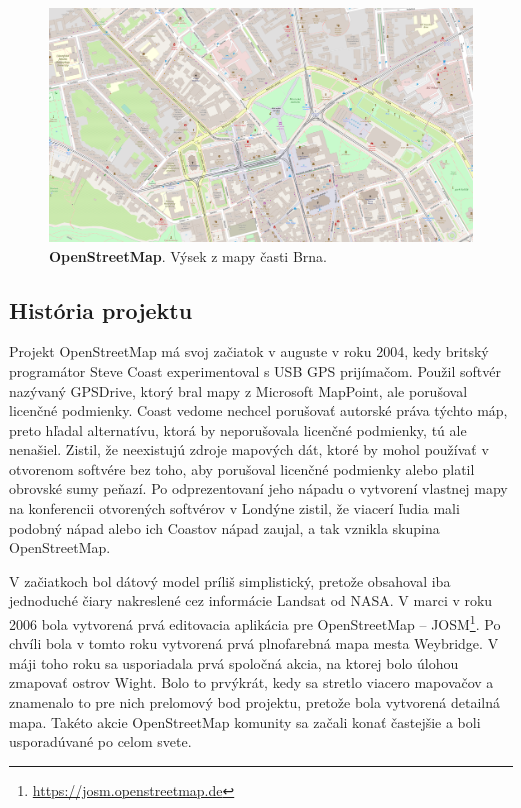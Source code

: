 \begin{figure}[ht]
    \centering
    \includegraphics[width=\linewidth]{obrazky-figures/openstreetmap.png}
    \caption{\textbf{OpenStreetMap}. Výsek z mapy časti Brna.}
    \label{fig:openstreetmap}
\end{figure}

\subsection*{História projektu}
Projekt OpenStreetMap má svoj začiatok v auguste v roku 2004, kedy britský programátor Steve Coast experimentoval s USB GPS prijímačom. Použil softvér nazývaný GPSDrive, ktorý bral mapy z Microsoft MapPoint, ale porušoval licenčné podmienky. Coast vedome nechcel porušovať autorské práva týchto máp, preto hľadal alternatívu, ktorá by neporušovala licenčné podmienky, tú ale nenašiel. Zistil, že neexistujú zdroje mapových dát, ktoré by mohol používať v otvorenom softvére bez toho, aby porušoval licenčné podmienky alebo platil obrovské sumy peňazí. Po odprezentovaní jeho nápadu o vytvorení vlastnej mapy na konferencii otvorených softvérov v Londýne zistil, že viacerí ľudia mali podobný nápad alebo ich Coastov nápad zaujal, a tak vznikla skupina OpenStreetMap.

V začiatkoch bol dátový model príliš simplistický, pretože obsahoval iba jednoduché čiary nakreslené cez informácie Landsat od NASA. V marci v roku 2006 bola vytvorená prvá editovacia aplikácia pre OpenStreetMap \--- JOSM\footnote{\url{https://josm.openstreetmap.de}}. Po chvíli bola v tomto roku vytvorená prvá plnofarebná mapa mesta Weybridge. V máji toho roku sa usporiadala prvá spoločná akcia, na ktorej bolo úlohou zmapovať ostrov Wight. Bolo to prvýkrát, kedy sa stretlo viacero mapovačov a znamenalo to pre nich prelomový bod projektu, pretože bola vytvorená detailná mapa. Takéto akcie OpenStreetMap komunity sa začali konať častejšie a boli usporadúvané po celom svete.

